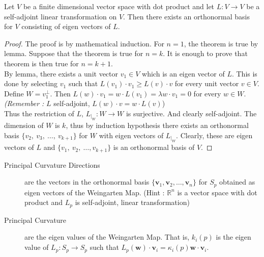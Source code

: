 \begin{theorem}
	Let $V$ be a finite dimensional vector space with dot product and let $L : V \to V$ be a self-adjoint linear transformation on $V$.
	Then there exists an orthonormal basis for $V$ consisting of eigen vectors of $L$.
\end{theorem}
\begin{proof}
	The proof is by mathematical induction.
	For $n=1$, the theorem is true by lemma.%
	Suppose that the theorem is true for $n = k$.
	It is enough to prove that theorem is then true for $n=k+1$.\\


	By lemma, there exists a unit vector $v_1 \in V$ which is an eigen vector of $L$.
	This is done by selecting $v_1$ such that $L(v_1) \cdot v_1 \ge L(v) \cdot v$ for every unit vector $v \in V$.
	Define $W = v_1^\perp$.
	Then $L(w) \cdot v_1 = w \cdot L(v_1) = \lambda w \cdot v_1 = 0$ for every $w \in W$.
	\textit{(Remember :}
	$L$ self-adjoint, $L(w) \cdot v = w \cdot L(v)$)\\


	Thus the restriction of $L$, $L_{|_W} : W \to W$ is surjective.
	And clearly self-adjoint.
	The dimension of $W$ is $k$, thus by induction hypothesis there exists an orthonormal basis $\{ v_2,\ v_3,\ \dots,\ v_{k+1} \}$ for $W$ with eigen vectors of $L_{|_W}$.
	Clearly, these are eigen vectors of $L$ and $\{ v_1,\ v_2,\ \dots, v_{k+1} \}$ is an orthonormal basis of $V$.
\end{proof}

\begin{description}
	\item[Principal Curvature Directions] are the vectors in the orthonormal basis $\{ \boldsymbol{v}_1,\boldsymbol{v}_2,\dots,\boldsymbol{v}_n \}$ for $S_p$ obtained as eigen vectors of the Weingarten Map.
		(Hint : $\mathbb{R}^n$ is a vector space with dot product and $L_p$ is self-adjoint, linear transformation)
	\item[Principal Curvature] are the eigen values of the Weingarten Map.
		That is, $k_i(p)$ is the eigen value of $L_p : S_p \to S_p$ such that $L_p(\boldsymbol{w}) \cdot \boldsymbol{v}_i = \kappa_i(p) \boldsymbol{w} \cdot \boldsymbol{v}_i$.
\end{description}

